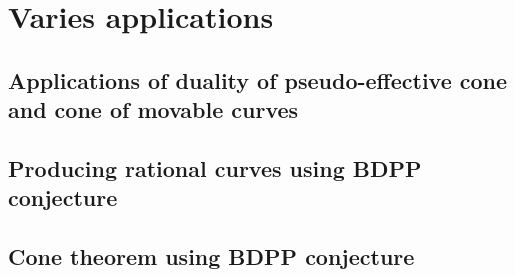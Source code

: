 \documentclass[11pt]{article}
\theoremstyle{definition}
\begin{document}
	\section{Varies applications}
	\subsection{Applications of duality of pseudo-effective cone and cone of movable curves}
	
	\subsection{Producing rational curves using BDPP conjecture}
	
	\subsection{Cone theorem using BDPP conjecture}
	
	
	
	
\end{document}
